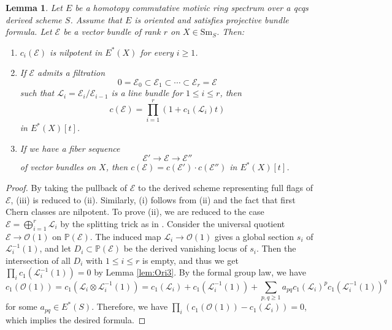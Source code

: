 \documentclass{amsart}
\theoremstyle{plain}
\newtheorem{lemma}[theorem]{Lemma}
\theoremstyle{definition}
\theoremstyle{remark}
\numberwithin{equation}{theorem}
\newcommand{\mcal}[1]{\mathcal{#1}}
\newcommand{\mbb}[1]{\mathbb{#1}}
\newcommand{\Sm}{\mathrm{Sm}}
\begin{document}
\begin{lemma}\label{lem:Che}
Let $E$ be a homotopy commutative motivic ring spectrum over a qcqs derived scheme $S$.
Assume that $E$ is oriented and satisfies projective bundle formula.
Let $\mcal{E}$ be a vector bundle of rank $r$ on $X\in\Sm_S$.
Then:
\begin{enumerate}[label=\upshape{(\roman*)}]
\item $c_i(\mcal{E})$ is nilpotent in $E^*(X)$ for every $i\ge 1$.
\item If $\mcal{E}$ admits a filtration
\[
	0=\mcal{E}_0 \subset \mcal{E}_1 \subset \cdots \subset \mcal{E}_r=\mcal{E}
\]
such that $\mcal{L}_i=\mcal{E}_i/\mcal{E}_{i-1}$ is a line bundle for $1\le i\le r$, then 
\[
	c(\mcal{E}) = \prod_{i=1}^r(1+c_1(\mcal{L}_i)t)
\]
in $E^*(X)[t]$.
\item If we have a fiber sequence
\[
	\mcal{E}' \to \mcal{E} \to \mcal{E}''
\]
of vector bundles on $X$, then $c(\mcal{E})=c(\mcal{E}')\cdot c(\mcal{E}'')$ in $E^*(X)[t]$.
\end{enumerate} 
\end{lemma}
\begin{proof}
By taking the pullback of $\mcal{E}$ to the derived scheme representing full flags of $\mcal{E}$, (iii) is reduced to (ii).
Similarly, (i) follows from (ii) and the fact that first Chern classes are nilpotent.
To prove (ii), we are reduced to the case $\mcal{E}=\bigoplus_{i=1}^r\mcal{L}_i$ by the splitting trick as in \cite[Lemma 4.4]{AI}.
Consider the universal quotient $\mcal{E}\to\mcal{O}(1)$ on $\mbb{P}(\mcal{E})$.
The induced map $\mcal{L}_i\to\mcal{O}(1)$ gives a global section $s_i$ of $\mcal{L}_i^{-1}(1)$, and let $D_i\subset\mbb{P}(\mcal{E})$ be the derived vanishing locus of $s_i$.
Then the intersection of all $D_i$ with $1\le i\le r$ is empty, and thus we get $\prod_ic_1(\mcal{L}_i^{-1}(1))=0$ by Lemma \ref{lem:Ori3}.
By the formal group law, we have
\[
	c_1(\mcal{O}(1)) = c_1(\mcal{L}_i\otimes\mcal{L}_i^{-1}(1))
					 = c_1(\mcal{L}_i) + c_1(\mcal{L}_i^{-1}(1)) + \sum_{p,q\ge 1}a_{pq}c_1(\mcal{L}_i)^pc_1(\mcal{L}_i^{-1}(1))^q
\]
for some $a_{pq}\in E^*(S)$.
Therefore, we have $\prod_i(c_1(\mcal{O}(1))-c_1(\mcal{L}_i))=0$, which implies the desired formula.
\end{proof}
\end{document}
